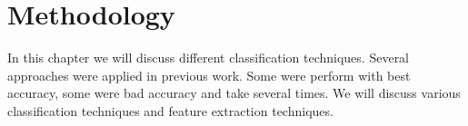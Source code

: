 \documentclass{standalone}
\begin{document}
\chapter{Methodology}
In this chapter we will discuss different classification techniques. Several approaches were applied in previous work. Some were perform with best accuracy, some were bad accuracy and take several times. We will discuss various classification techniques and feature extraction techniques.
\end{document}
